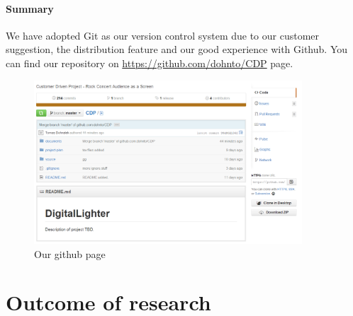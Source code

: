 \paragraph{Summary} We have adopted Git as our version control system due to our customer suggestion, the distribution feature and our good experience with Github.
You can find our repository on \url{https://github.com/dohnto/CDP} page.


\begin{figure}[!t]
	\centering
		\includegraphics[width=10cm]{preliminaryStudies/git.png}
	\caption{Our github page}
	\label{img:git}
\end{figure}

\section{Outcome of research}
